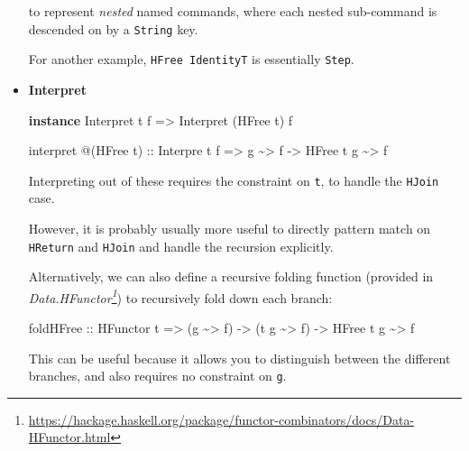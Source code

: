 \documentclass[]{article}
\newenvironment{Shaded}{}{}
\newcommand{\DataTypeTok}[1]{\textcolor[rgb]{0.56,0.13,0.00}{#1}}
\newcommand{\KeywordTok}[1]{\textcolor[rgb]{0.00,0.44,0.13}{\textbf{#1}}}
\newcommand{\NormalTok}[1]{#1}
\newcommand{\OperatorTok}[1]{\textcolor[rgb]{0.40,0.40,0.40}{#1}}
\newcommand{\OtherTok}[1]{\textcolor[rgb]{0.00,0.44,0.13}{#1}}
\renewcommand{\href}[2]{#2\footnote{\url{#1}}}
\begin{document}
\begin{itemize}
  to represent \emph{nested} named commands, where each nested sub-command is
  descended on by a \texttt{String} key.

  For another example, \texttt{HFree\ IdentityT} is essentially \texttt{Step}.
\item
  \textbf{Interpret}

\begin{Shaded}
\begin{Highlighting}[]
\KeywordTok{instance} \DataTypeTok{Interpret}\NormalTok{ t f }\OtherTok{=\textgreater{}} \DataTypeTok{Interpret}\NormalTok{ (}\DataTypeTok{HFree}\NormalTok{ t) f}

\NormalTok{interpret }\OperatorTok{@}\NormalTok{(}\DataTypeTok{HFree}\NormalTok{ t)}
\OtherTok{    ::} \DataTypeTok{Interpre}\NormalTok{ t f}
    \OtherTok{=\textgreater{}}\NormalTok{ g }\OperatorTok{\textasciitilde{}\textgreater{}}\NormalTok{ f}
    \OtherTok{{-}\textgreater{}} \DataTypeTok{HFree}\NormalTok{ t g }\OperatorTok{\textasciitilde{}\textgreater{}}\NormalTok{ f}
\end{Highlighting}
\end{Shaded}

  Interpreting out of these requires the constraint on \texttt{t}, to handle the
  \texttt{HJoin} case.

  However, it is probably usually more useful to directly pattern match on
  \texttt{HReturn} and \texttt{HJoin} and handle the recursion explicitly.

  Alternatively, we can also define a recursive folding function (provided in
  \emph{\href{https://hackage.haskell.org/package/functor-combinators/docs/Data-HFunctor.html}{Data.HFunctor}})
  to recursively fold down each branch:

\begin{Shaded}
\begin{Highlighting}[]
\NormalTok{foldHFree}
\OtherTok{    ::} \DataTypeTok{HFunctor}\NormalTok{ t}
    \OtherTok{=\textgreater{}}\NormalTok{ (g }\OperatorTok{\textasciitilde{}\textgreater{}}\NormalTok{ f)}
    \OtherTok{{-}\textgreater{}}\NormalTok{ (t g }\OperatorTok{\textasciitilde{}\textgreater{}}\NormalTok{ f)}
    \OtherTok{{-}\textgreater{}} \DataTypeTok{HFree}\NormalTok{ t g }\OperatorTok{\textasciitilde{}\textgreater{}}\NormalTok{ f}
\end{Highlighting}
\end{Shaded}

  This can be useful because it allows you to distinguish between the different
  branches, and also requires no constraint on \texttt{g}.


\end{itemize}
\end{document}
